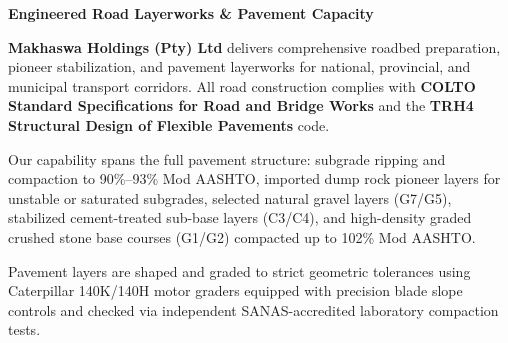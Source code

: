 \documentclass[a4paper,11pt]{article}
\begin{document}
\noindent
\begin{minipage}[t]{0.62\textwidth}
    \vspace{0pt}
    {\large\bfseries\color{mhnavy} Engineered Road Layerworks \& Pavement Capacity}
    \vspace{0.12cm}

    {\fontsize{9pt}{13pt}\selectfont\color{mhtext}
    \textbf{Makhaswa Holdings (Pty) Ltd} delivers comprehensive roadbed preparation, pioneer stabilization, and pavement layerworks for national, provincial, and municipal transport corridors. All road construction complies with \textbf{COLTO Standard Specifications for Road and Bridge Works} and the \textbf{TRH4 Structural Design of Flexible Pavements} code.
    }

    \vspace{0.22cm}

    {\fontsize{9pt}{13pt}\selectfont\color{mhtext}
    Our capability spans the full pavement structure: subgrade ripping and compaction to 90\%--93\% Mod AASHTO, imported dump rock pioneer layers for unstable or saturated subgrades, selected natural gravel layers (G7/G5), stabilized cement-treated sub-base layers (C3/C4), and high-density graded crushed stone base courses (G1/G2) compacted up to 102\% Mod AASHTO.
    }

    \vspace{0.22cm}

    {\fontsize{9pt}{13pt}\selectfont\color{mhtext}
    Pavement layers are shaped and graded to strict geometric tolerances using Caterpillar 140K/140H motor graders equipped with precision blade slope controls and checked via independent SANAS-accredited laboratory compaction tests.
    }
\end{minipage}
\hfill
\end{document}
